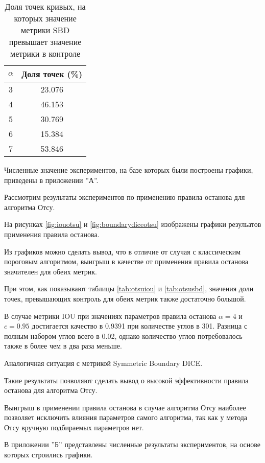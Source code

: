 \begin{table}[H]
\centering
\caption{Доля точек кривых, на которых значение метрики SBD превышает значение метрики в  контроле}
\label{tab:thresholdingsbd}
\begin{tabular}{|c|c|}
\hline
\(\alpha\) & Доля точек (\%) \\
\hline
3 & 23.076 \\
4 & 46.153 \\
5 & 30.769 \\
6 & 15.384 \\
7 & 53.846 \\
\hline
\end{tabular}
\end{table}

Численные значение экспериментов, на базе которых были построены графики, приведены в приложении ''А''.

Рассмотрим результаты экспериментов по применению правила останова для алгоритма Отсу. 

На рисунках \ref*{fig:iouotsu} и \ref*{fig:boundarydiceotsu} изображены графики резульатов применения правила останова. 

Из графиков можно сделать вывод, что в отличие от случая с классическим пороговым алгоритмом, выигрыш в качестве от применения правила останова значителен для обеих метрик. 

При этом, как показывают таблицы \ref*{tab:otsuiou} и \ref*{tab:otsusbd}, значения доли точек, превышающих контроль для обеих метрик также достаточно большой.

В случае метрики IOU при значениях параметров правила останова \(\alpha = 4\) и \(c = 0.95\) достигается качество в 0.9391 при количестве углов в 301. Разница с полным набором углов всего в 0.02, однако количество углов потребовалось также в более чем в два раза меньше.

Аналогичная ситуация с метрикой Symmetric Boundary DICE.
 
Такие результаты позволяют сделать вывод о высокой эффективности правила останова для алгоритма Отсу.

Выигрыш в применении правила останова в случае алгоритма Отсу наиболее позволяет исключить влияния параметров самого алгоритма, так как у метода Отсу вручную подбираемых параметров нет.

В приложении ''Б'' представлены численные результаты экспериментов, на основе которых строились графики.

 

